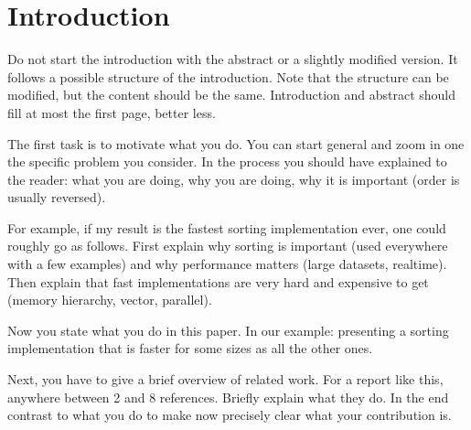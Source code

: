 \section{Introduction}
  \label{sec:intro}

  Do not start the introduction with the abstract or a slightly modified
  version. It follows a possible structure of the introduction. 
  Note that the structure can be modified, but the
  content should be the same. Introduction and abstract should fill at most the first page, better less.

   The first task is to motivate what you do.  You can
  start general and zoom in one the specific problem you consider.  In
  the process you should have explained to the reader: what you are doing,
  why you are doing, why it is important (order is usually reversed).

  For example, if my result is the fastest sorting implementation ever, one
  could roughly go as follows. First explain why sorting is important
  (used everywhere with a few examples) and why performance matters (large datasets,
  realtime). Then explain that fast implementations are very hard and
  expensive to get (memory hierarchy, vector, parallel). 

  Now you state what you do in this paper. In our example: 
  presenting a sorting implementation that is
  faster for some sizes as all the other ones.

   Next, you have to give a brief overview of
  related work. For a report like this, anywhere between 2 and 8
  references. Briefly explain what they do. In the end contrast to what
  you do to make now precisely clear what your contribution is.

